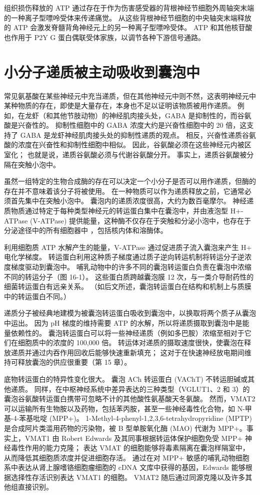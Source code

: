 组织损伤释放的 ATP 通过存在于作为伤害感受器的背根神经节细胞外周轴突末端的一种离子型嘌呤受体来传递痛觉。 从这些背根神经节细胞的中央轴突末端释放的 ATP 会激发脊髓背角神经元上的另一种离子型嘌呤受体。 ATP 和其他核苷酸也作用于 P2Y G 蛋白偶联受体家族，以调节各种下游信号通路。


\section{小分子递质被主动吸收到囊泡中}
常见氨基酸在某些神经元中充当递质，但在其他神经元中则不然，这表明神经元中某种物质的存在，即使是大量存在，本身也不足以证明该物质被用作递质。 例如，在龙虾（和其他节肢动物）的神经肌肉接头处，GABA 是抑制性的，而谷氨酸是兴奋性的。 抑制性细胞中的 GABA 浓度大约是兴奋性细胞中的 20 倍，这支持了 GABA 是龙虾神经肌肉接头处的抑制性递质的观点。 相反，兴奋性递质谷氨酸的浓度在兴奋性和抑制性细胞中相似。 因此，谷氨酸必须在这些神经元内被区室化； 也就是说，递质谷氨酸必须与代谢谷氨酸分开。 事实上，递质谷氨酸被分隔在突触小泡中。

虽然一组特定的生物合成酶的存在可以决定一个小分子是否可以用作递质，但酶的存在并不意味着该分子将被使用。 在一种物质可以作为递质释放之前，它通常必须首先集中在突触小泡中。 囊泡内的递质浓度很高，大约为数百毫摩尔。 神经递质物质通过特定于每种类型神经元的转运蛋白集中在囊泡中，并由液泡型 H+-ATPase (V-ATPase) 提供能量，这种酶不仅存在于突触和分泌小泡中，也存在于分泌途径中的所有细胞器中 ，包括核内体和溶酶体。

利用细胞质 ATP 水解产生的能量，V-ATPase 通过促进质子流入囊泡来产生 H+ 电化学梯度。 转运蛋白利用这种质子梯度通过质子逆向转运机制将转运分子逆浓度梯度驱动到囊泡中。 哺乳动物中的许多不同的囊泡转运蛋白负责在囊泡中浓缩不同的转运分子（图 16-1）。 这些蛋白质跨越囊泡膜 12 次，与一类介导耐药性的细菌转运蛋白有远亲关系。 （如后文所述，囊泡转运蛋白在结构和机制上与质膜中的转运蛋白不同。）

递质分子被经典地建模为被囊泡转运蛋白吸收到囊泡中，以换取将两个质子从囊泡中运出。 因为 pH 梯度的维持需要 ATP 的水解，所以将递质摄取到囊泡中是能量依赖性的。 囊泡转运蛋白可以将一些神经递质（例如多巴胺）浓缩至相对于它们在细胞质中的浓度的 100,000 倍。 转运体对递质的摄取速度很快，使囊泡在释放递质并通过内吞作用回收后能够快速重新填充； 这对于在快速神经放电期间维持可释放囊泡的供应很重要（第 15 章）。

底物转运蛋白的特异性变化很大。 囊泡 ACh 转运蛋白 (VAChT) 不转运胆碱或其他递质。 同样，在中枢神经系统中差异表达的三种类型（VGLUT1、2 和 3）的囊泡谷氨酸转运蛋白携带可忽略不计的其他酸性氨基酸天冬氨酸。 然而，VMAT2 可以运输所有生物胺以及药物，包括苯丙胺，甚至一些神经毒性化合物，如 N-甲基-4-苯基吡啶 (MPP+)。 1-Methyl-4-phenyl-1,2,3,6-tetrahydropyridine (MPTP) 是合成阿片类滥用药物的污染物，被 B 型单胺氧化酶 (MAO) 代谢为 MPP+。事实上，VMAT1 由 Robert Edwards 及其同事根据转运体保护细胞免受 MPP+ 神经毒性作用的能力克隆； 表达 VMAT 的细胞能够将毒素隔离在囊泡样隔室中，从而降低其细胞质浓度并促进细胞存活。 通过在对 MPP+ 敏感的哺乳动物细胞系中表达从肾上腺嗜铬细胞瘤细胞的 cDNA 文库中获得的基因，Edwards 能够根据选择性存活识别表达 VMAT1 的细胞。 VMAT2 随后通过同源克隆以及许多其他组直接识别。

